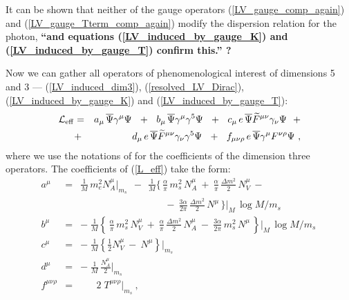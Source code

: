 \documentclass[12pt]{revtex4}
\begin{document}
It can be shown 
\cite{GrootNibbelink:2004za}
that neither of the gauge operators 
(\ref{LV_gauge_comp_again}) and
(\ref{LV_gauge_Tterm_comp_again}) 
modify the dispersion relation for the photon,
{\bf ``and equations (\ref{LV_induced_by_gauge_K})
  and (\ref{LV_induced_by_gauge_T}) confirm this.'' ?}





Now we can gather all operators of phenomenological
interest of dimensions 5 and 3 --- 
(\ref{LV_induced_dim3}), (\ref{resolved_LV_Dirac}),
(\ref{LV_induced_by_gauge_K}) and
(\ref{LV_induced_by_gauge_T}):
\begin{eqnarray}
\label{L_eff}
  \mathcal{L}_{\rm eff}
        & = &
        a_\mu\, \overline{\Psi} \gamma^\mu \Psi
~~+~~
b_\mu\, \overline{\Psi} \gamma^\mu \gamma^5 \Psi
~~+~~
c_\mu\, e\, \overline{\Psi} \widetilde{F}^{\mu\nu}
                    \gamma_\nu \Psi
        ~~+\\
\nonumber
& + &
d_\mu\, e\, \overline{\Psi} \widetilde{F}^{\mu\nu}
                    \gamma_\nu \gamma^5 \Psi
        ~~+~~
        f_{\mu\nu\rho}\, 
     e\, \overline{\Psi} \gamma^\mu F^{\nu\rho} \Psi
~,
\end{eqnarray}
where we use the notations of 
\cite{Colladay:1998fq}
for the coefficients of the 
dimension three operators.
The coefficients of (\ref{L_eff}) take the form:
\begin{eqnarray}
\nonumber
        a^\mu & = &
	 \frac{1}{M}\, m_e^2 N_A^\mu \Bigr|_{m_s}
	~~-~~
	\frac{1}{M}
	\Biggl\{\,
        	\frac{\alpha}{\pi}\, m_s^2\, N_A^\mu 
		~+~
		\frac{\alpha}{\pi}\, \frac{\Delta m^2}{2}\, 
                                             N_V^\mu
		~-~\\
\nonumber
        &&
\qquad\qquad\qquad\qquad~\;
		~-~
		\frac{3\alpha}{2\pi}\, \frac{\Delta m^2}{2}\, 
                                               N^\mu
       		\,
	\Biggr\}\Biggr|_M\, \log M/m_s~
\\
\nonumber
	b^\mu & = & 
	-\;
	\frac{1}{M}
	\left\{\,
        	\frac{\alpha}{\pi}\, m_s^2\, N_V^\mu
		~+~
		\frac{\alpha}{\pi}\, \frac{\Delta m^2}{2}\, 
                                             N_A^\mu
		~-~
		\frac{3\alpha}{2\pi}\, m_s^2\, N^\mu
       		\,
	\right\}\Biggr|_M\, \log M/m_s~
\\
\label{L_eff_coefs}
	c^\mu & = &
	-\;
	\frac{1}{M}
	\left\{ 
       		\frac{1}{2}N_V^\mu
       		~-~
       		N^\mu
	\right\} \Biggr|_{m_s}
\\
\nonumber
	d^\mu & = &
	-\;
	\frac{1}{M}\, \frac{N_A^\mu}{2} \Biggr|_{m_s}
\\
\nonumber
	f^{\mu\nu\rho} & = &
	\phantom{~-~}
	2\; T^{\mu\nu\rho}
	\Biggr|_{m_s}
~,
\end{eqnarray}
\end{document}

